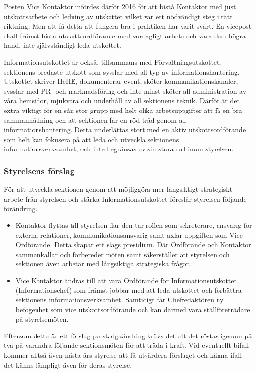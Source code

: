 \documentclass[../_main/handlingar.tex]{subfiles}
\begin{document}
Posten Vice Kontaktor infördes därför 2016 för att bistå Kontaktor med just utskottsarbete och ledning av utskottet vilket var ett nödvändigt steg i rätt riktning. Men att få detta att fungera bra i praktiken har varit svårt. En vicepost skall främst bistå utskottsordförande med vardagligt arbete och vara dess högra hand, inte självständigt leda utskottet. 

Informationsutskottet är också, tillsammans med Förvaltningsutskottet, sektionens bredaste utskott som sysslar med all typ av informationshantering. Utskottet skriver HeHE, dokumenterar event, sköter kommunikationskanaler, sysslar med PR- och marknadsföring och inte minst sköter all administration av våra hemsidor, mjukvara och underhåll av all sektionens teknik. Därför är det extra viktigt för en sån stor grupp med helt olika arbetsuppgifter att få en bra sammanhållning och att sektionen får en röd tråd genom all informationshantering. Detta underlättas stort med en aktiv utskottsordförande som helt kan fokusera på att leda och utveckla sektionens informationsverksamhet, och inte begränsas av sin stora roll inom styrelsen.

\newpage

\subsubsection{Styrelsens förslag} 

För att utveckla sektionen genom att möjliggöra mer långsiktigt strategiskt arbete från styrelsen och stärka Informationsutskottet föreslår styrelsen följande förändring.

\begin{itemize}
  \item Kontaktor flyttas till styrelsen där den tar rollen som sekreterare, ansvarig för externa relationer, kommunikationsansvarig samt axlar uppgiften som Vice Ordförande. Detta skapar ett slags presidium. Där Ordförande och Kontaktor sammankallar och förbereder möten samt säkerställer att styrelsen och sektionen även arbetar med långsiktiga strategiska frågor. 
  \item Vice Kontaktor ändras till att vara Ordförande för Informationsutskottet (Informationschef) som främst jobbar med att leda utskottet och förbättra sektionens informationsverksamhet. Samtidigt får Chefredaktören ny befogenhet som vice utskottsordförande och kan därmed vara ställföreträdare på styrelsemöten.
\end{itemize}

Eftersom detta är ett förslag på stadgaändring krävs det att det röstas igenom på två på varandra följande sektionsmöten för att träda i kraft. Vid eventuellt bifall kommer alltså även nästa års styrelse att få utvärdera förslaget och känna ifall det känns lämpligt även för deras styrelse.
\end{document}
